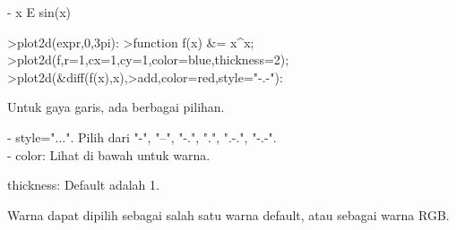 \documentclass[a4paper,10pt]{article}
\begin{document}
\begin{eulernotebook}
\begin{eulercomment}
\begin{eulercomment}
\begin{eulercomment}
\begin{eulercomment}
\begin{eulercomment}
\begin{eulercomment}
\begin{eulercomment}
\begin{eulercomment}
\begin{eulercomment}
\begin{eulercomment}
\begin{eulercomment}
\begin{eulercomment}
\begin{euleroutput}
                                - x
                               E    sin(x)
  
\end{euleroutput}
\begin{eulerprompt}
>plot2d(expr,0,3pi):
>function f(x) &= x^x;
>plot2d(f,r=1,cx=1,cy=1,color=blue,thickness=2);
>plot2d(&diff(f(x),x),>add,color=red,style="-.-"):
\end{eulerprompt}
\begin{eulercomment}
Untuk gaya garis, ada berbagai pilihan.

- style="...". Pilih dari "-", "--", "-.", ".", ".-.", "-.-".\\
- color: Lihat di bawah untuk warna.

thickness: Default adalah 1.

Warna dapat dipilih sebagai salah satu warna default, atau sebagai
warna RGB.


\end{eulercomment}
\end{eulercomment}
\end{eulercomment}
\end{eulercomment}
\end{eulercomment}
\end{eulercomment}
\end{eulercomment}
\end{eulercomment}
\end{eulercomment}
\end{eulercomment}
\end{eulercomment}
\end{eulercomment}
\end{eulercomment}
\end{eulernotebook}
\end{document}
